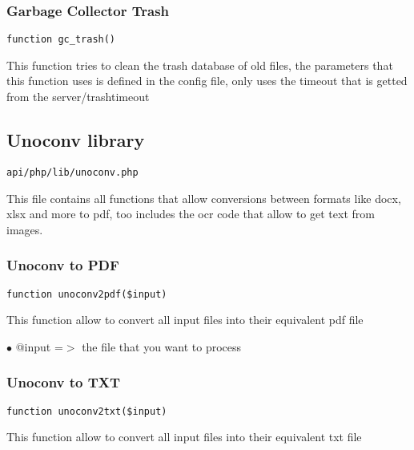 \documentclass[a4paper]{article}
\begin{document}
\hypertarget{toc530}{}
\subsubsection{Garbage Collector Trash}

\begin{lstlisting}
function gc_trash()
\end{lstlisting}

This function tries to clean the trash database of old files, the parameters
that this function uses is defined in the config file, only uses the timeout
that is getted from the server/trashtimeout

\hypertarget{toc531}{}
\subsection{Unoconv library}

\begin{lstlisting}
api/php/lib/unoconv.php
\end{lstlisting}

This file contains all functions that allow conversions between formats like
docx, xlsx and more to pdf, too includes the ocr code that allow to get text
from images.

\hypertarget{toc532}{}
\subsubsection{Unoconv to PDF}

\begin{lstlisting}
function unoconv2pdf($input)
\end{lstlisting}

This function allow to convert all input files into their equivalent pdf file

\begin{compactitem}
\item[\color{myblue}$\bullet$] @input =$>$ the file that you want to process
\end{compactitem}

\hypertarget{toc533}{}
\subsubsection{Unoconv to TXT}

\begin{lstlisting}
function unoconv2txt($input)
\end{lstlisting}

This function allow to convert all input files into their equivalent txt file
\end{document}

